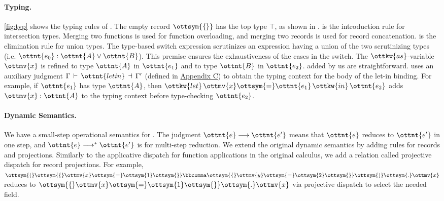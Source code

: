 \paragraph{Typing.}
\autoref{fig:typ} shows the typing rules of \lambdaiu. The empty record $\ottsym{\{\}}$
has the top type $ \top $, as shown in .  is the
introduction rule for intersection types. Merging two functions is used for
function overloading, and merging two records is used for record concatenation.
 is the elimination rule for union types. The type-based switch
expression scrutinizes an expression having a union of the two scrutinizing
types (i.e. $\ottnt{e_{{\mathrm{0}}}}:\ottnt{A}  \lor  \ottnt{B}$). This premise ensures the exhaustiveness of the
cases in the switch. The $\ottkw{as}$-variable $\ottmv{x}$ is refined to type
$\ottnt{A}$ in $\ottnt{e_{{\mathrm{1}}}}$ and to type $\ottnt{B}$ in $\ottnt{e_{{\mathrm{2}}}}$.
 added by us are straightforward. 
uses an auxiliary judgment $\Gamma  \,\vdash\,  \ottnt{letin}  \,\dashv\,  \Gamma'$ (defined in
\hyperref[sec:appendix-let]{Appendix C}) to obtain the typing context for the
body of the let-in binding. For example, if $\ottnt{e_{{\mathrm{1}}}}$ has type $\ottnt{A}$, then
$\ottkw{let} \, \ottmv{x}  \ottsym{=}  \ottnt{e_{{\mathrm{1}}}} \, \ottkw{in} \, \ottnt{e_{{\mathrm{2}}}}$ adds $\ottmv{x}:\ottnt{A}$ to the typing context before
type-checking $\ottnt{e_{{\mathrm{2}}}}$.

\paragraph{Dynamic Semantics.}
We have a small-step operational semantics for \lambdaiu. The judgment
$\ottnt{e}\longrightarrow\ottnt{e'}$ means that $\ottnt{e}$ reduces to $\ottnt{e'}$ in one step,
and $\ottnt{e}\longrightarrow^*\ottnt{e'}$ is for multi-step reduction. We extend the
original dynamic semantics by adding rules for records and projections.
Similarly to the applicative dispatch for function applications in the original
calculus, we add a relation called projective dispatch for record projections.
For example, $\ottsym{(}  \ottsym{\{}  \ottmv{x}  \ottsym{=}  \ottsym{1}  \ottsym{\}}  \bbcomma  \ottsym{\{}  \ottmv{y}  \ottsym{=}  \ottsym{2}  \ottsym{\}}  \ottsym{)}  \ottsym{.}  \ottmv{x}$ reduces to $\ottsym{\{}  \ottmv{x}  \ottsym{=}  \ottsym{1}  \ottsym{\}}  \ottsym{.}  \ottmv{x}$ via
projective dispatch to select the needed field.

